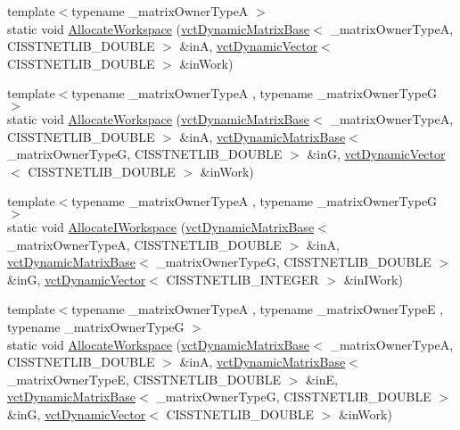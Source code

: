 \begin{DoxyCompactItemize}
\item 
{\footnotesize template$<$typename \-\_\-matrix\-Owner\-Type\-A $>$ }\\static void \hyperlink{classnmr_l_sq_lin_solution_dynamic_ac35f30dce8922ce26c8e76c66b573e6f}{Allocate\-Workspace} (\hyperlink{classvct_dynamic_matrix_base}{vct\-Dynamic\-Matrix\-Base}$<$ \-\_\-matrix\-Owner\-Type\-A, C\-I\-S\-S\-T\-N\-E\-T\-L\-I\-B\-\_\-\-D\-O\-U\-B\-L\-E $>$ \&in\-A, \hyperlink{classvct_dynamic_vector}{vct\-Dynamic\-Vector}$<$ C\-I\-S\-S\-T\-N\-E\-T\-L\-I\-B\-\_\-\-D\-O\-U\-B\-L\-E $>$ \&in\-Work)
\item 
{\footnotesize template$<$typename \-\_\-matrix\-Owner\-Type\-A , typename \-\_\-matrix\-Owner\-Type\-G $>$ }\\static void \hyperlink{classnmr_l_sq_lin_solution_dynamic_a3604dc4bd8e6c7407c0d93458eb39f9b}{Allocate\-Workspace} (\hyperlink{classvct_dynamic_matrix_base}{vct\-Dynamic\-Matrix\-Base}$<$ \-\_\-matrix\-Owner\-Type\-A, C\-I\-S\-S\-T\-N\-E\-T\-L\-I\-B\-\_\-\-D\-O\-U\-B\-L\-E $>$ \&in\-A, \hyperlink{classvct_dynamic_matrix_base}{vct\-Dynamic\-Matrix\-Base}$<$ \-\_\-matrix\-Owner\-Type\-G, C\-I\-S\-S\-T\-N\-E\-T\-L\-I\-B\-\_\-\-D\-O\-U\-B\-L\-E $>$ \&in\-G, \hyperlink{classvct_dynamic_vector}{vct\-Dynamic\-Vector}$<$ C\-I\-S\-S\-T\-N\-E\-T\-L\-I\-B\-\_\-\-D\-O\-U\-B\-L\-E $>$ \&in\-Work)
\item 
{\footnotesize template$<$typename \-\_\-matrix\-Owner\-Type\-A , typename \-\_\-matrix\-Owner\-Type\-G $>$ }\\static void \hyperlink{classnmr_l_sq_lin_solution_dynamic_a7d16698dad9e988a4cc8762829f2eac2}{Allocate\-I\-Workspace} (\hyperlink{classvct_dynamic_matrix_base}{vct\-Dynamic\-Matrix\-Base}$<$ \-\_\-matrix\-Owner\-Type\-A, C\-I\-S\-S\-T\-N\-E\-T\-L\-I\-B\-\_\-\-D\-O\-U\-B\-L\-E $>$ \&in\-A, \hyperlink{classvct_dynamic_matrix_base}{vct\-Dynamic\-Matrix\-Base}$<$ \-\_\-matrix\-Owner\-Type\-G, C\-I\-S\-S\-T\-N\-E\-T\-L\-I\-B\-\_\-\-D\-O\-U\-B\-L\-E $>$ \&in\-G, \hyperlink{classvct_dynamic_vector}{vct\-Dynamic\-Vector}$<$ C\-I\-S\-S\-T\-N\-E\-T\-L\-I\-B\-\_\-\-I\-N\-T\-E\-G\-E\-R $>$ \&in\-I\-Work)
\item 
{\footnotesize template$<$typename \-\_\-matrix\-Owner\-Type\-A , typename \-\_\-matrix\-Owner\-Type\-E , typename \-\_\-matrix\-Owner\-Type\-G $>$ }\\static void \hyperlink{classnmr_l_sq_lin_solution_dynamic_a4724f0d104ab5af54e5213c9c7cb7d08}{Allocate\-Workspace} (\hyperlink{classvct_dynamic_matrix_base}{vct\-Dynamic\-Matrix\-Base}$<$ \-\_\-matrix\-Owner\-Type\-A, C\-I\-S\-S\-T\-N\-E\-T\-L\-I\-B\-\_\-\-D\-O\-U\-B\-L\-E $>$ \&in\-A, \hyperlink{classvct_dynamic_matrix_base}{vct\-Dynamic\-Matrix\-Base}$<$ \-\_\-matrix\-Owner\-Type\-E, C\-I\-S\-S\-T\-N\-E\-T\-L\-I\-B\-\_\-\-D\-O\-U\-B\-L\-E $>$ \&in\-E, \hyperlink{classvct_dynamic_matrix_base}{vct\-Dynamic\-Matrix\-Base}$<$ \-\_\-matrix\-Owner\-Type\-G, C\-I\-S\-S\-T\-N\-E\-T\-L\-I\-B\-\_\-\-D\-O\-U\-B\-L\-E $>$ \&in\-G, \hyperlink{classvct_dynamic_vector}{vct\-Dynamic\-Vector}$<$ C\-I\-S\-S\-T\-N\-E\-T\-L\-I\-B\-\_\-\-D\-O\-U\-B\-L\-E $>$ \&in\-Work)

\end{DoxyCompactItemize}
